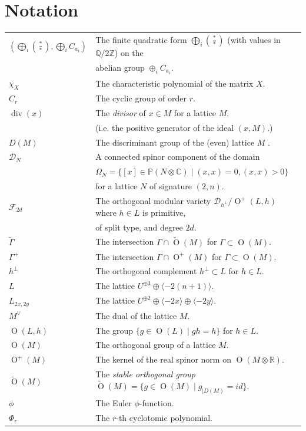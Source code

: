 \documentclass[11pt]{amsart}
\newcommand{\RR}{\mathbb{R}}
\newcommand{\CC}{\mathbb{C}}
\newcommand{\ZZ}{\mathbb{Z}}
\newcommand{\QQ}{\mathbb{Q}}
\newcommand{\PP}{\mathbb{P}}
\newcommand{\dc}{\mathcal{D}}
\newcommand{\la}{\langle}
\newcommand{\ra}{\rangle}
\newcommand{\opn}{\operatorname}
\newcommand{\op}{\oplus}
\newcommand{\fc}{\mathcal{F}}
\begin{document}
\section{Notation}
\begin{tabular}{l l}
$( \bigoplus_i (\frac{*}{*}), \bigoplus_i C_{a_i} )$ & The finite quadratic form $\bigoplus_i (\frac{*}{*})$ (with values in $\QQ/2\ZZ$) on the \\
& abelian group $\op_i C_{a_i}$. \\ 
$\chi_X$ & The characteristic polynomial of the matrix $X$.\\
$C_r$ & The cyclic group of order $r$.\\
$\opn{div}(x)$ & The \emph{divisor} of $x \in M$ for a lattice $M$. \\
& (i.e. the positive generator of the ideal $(x, M)$.)\\  
$D(M)$ & The discriminant group of the (even) lattice $M$ \cite{Nikulin}. \\
$\dc_N$ & A connected spinor component of the domain  \\
& $\Omega_N = \{ [x] \in \PP(N \otimes \CC) \mid (x, x)= 0, (x, \overline{x})>0 \}$ \\
& for a lattice $N$ of signature $(2,n)$. \\
$\fc_{2d}$ & The orthogonal modular variety $\dc_{h^{\perp}} / \opn{O}^+(L, h)$ where $h \in L$ is primitive,\\
 & of split type, and degree $2d$.\\
$\widetilde{\Gamma}$ & The intersection $\Gamma \cap \widetilde{\opn{O}}(M)$ for $\Gamma \subset \opn{O}(M)$. \\
$\Gamma^+$ & The intersection $\Gamma \cap \opn{O}^+(M)$ for $\Gamma \subset \opn{O}(M)$. \\
$h^{\perp}$ & The orthogonal complement $h^{\perp} \subset L$ for $h \in L$. \\ 
$L$    & The lattice $U^{\op 3} \op \la -2(n+1) \ra$. \\
$L_{2x,2y}$ & The lattice $U^{\op 2} \op \la -2x \ra \op \la -2y \ra$. \\
$M^{\vee}$ & The dual of the lattice $M$.\\
$\opn{O}(L, h)$ & The group $\{g \in \opn{O}(L) \mid gh = h \}$ for $h \in L$. \\ 
$\opn{O}(M)$ & The orthogonal group of a lattice $M$. \\
$\opn{O}^+(M)$ & The kernel of the real spinor norm on $\opn{O}(M \otimes \RR)$. \\
$\widetilde{\opn{O}}(M)$ & The \emph{stable orthogonal group} $\widetilde{\opn{O}}(M) = \{ g \in \opn{O}(M) \mid g_{\vert D(M)}=id \}$. \\
$\phi$ & The Euler $\phi$-function.\\
$\Phi_r$ & The $r$-th cyclotomic polynomial.\\
\end{tabular}
\end{document}
